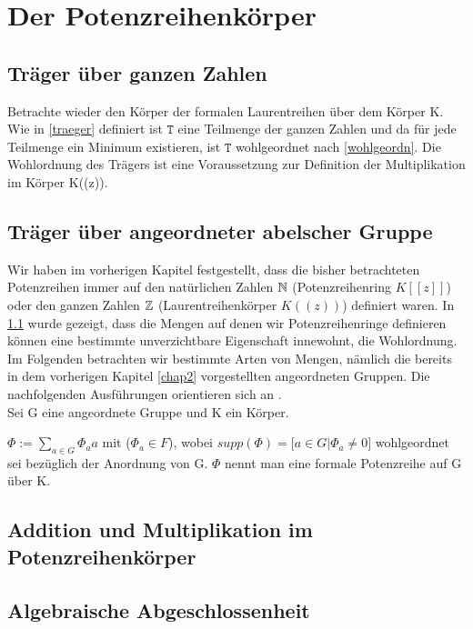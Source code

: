 \section{Der Potenzreihenkörper}
%
\subsection{Träger über ganzen Zahlen}\label{traegerGanz}
Betrachte wieder den Körper der formalen Laurentreihen über dem Körper K. Wie in \ref{traeger} definiert ist $\mathtt{T}$ eine Teilmenge der ganzen Zahlen und da für jede Teilmenge ein Minimum existieren, ist $\mathtt{T}$ wohlgeordnet nach \ref{wohlgeordn}. Die Wohlordnung des Trägers ist eine Voraussetzung zur Definition der Multiplikation im Körper K((z)). 
%
%
\subsection{Träger über angeordneter abelscher Gruppe}
Wir haben im vorherigen Kapitel festgestellt, dass die bisher betrachteten Potenzreihen immer auf den natürlichen Zahlen $\mathbb{N}$ (Potenzreihenring $K[[z]]$) oder den ganzen Zahlen $\mathbb{Z}$ (Laurentreihenkörper $K((z))$) definiert waren. In \ref{traegerGanz} wurde gezeigt, dass die Mengen auf denen wir Potenzreihenringe definieren können eine bestimmte unverzichtbare Eigenschaft innewohnt, die Wohlordnung. Im Folgenden betrachten wir bestimmte Arten von Mengen, nämlich die bereits in dem vorherigen Kapitel \ref{chap2} vorgestellten angeordneten Gruppen. Die nachfolgenden Ausführungen orientieren sich an \cite{fuchs66}.\\
%
Sei G eine angeordnete Gruppe und K ein Körper. 
\begin{defn}\label{formaleSumme}
$\Phi := \sum_{a \in G}^{} \Phi_a a$ mit ($\Phi_a \in F$), wobei $supp(\Phi) = \lbrack a \in G | \Phi_a \neq 0\rbrack$ wohlgeordnet sei bezüglich der Anordnung von G. $\Phi$ nennt man eine formale Potenzreihe auf G über K.
\end{defn}
\subsection{Addition und Multiplikation im Potenzreihenkörper}
\subsection{Algebraische Abgeschlossenheit} %
%